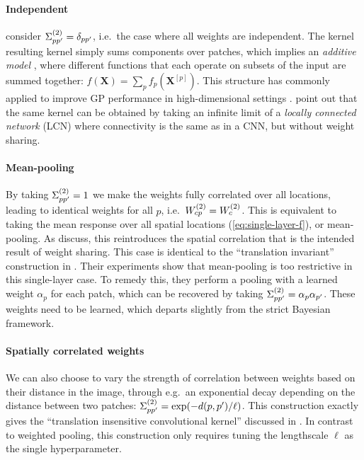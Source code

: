 \documentclass{article}
\theoremstyle{definition}
\newcommand{\vX}{\mathbf{X}}
\begin{document}
\paragraph{Independent} \citet{garriga2018infiniteconv,novak2019infiniteconv} consider $\Sigma^{(2)}_{pp'} = \delta_{pp'}$, i.e.~the case where all weights are independent. The kernel resulting kernel simply sums components over patches, which implies an \emph{additive model} \citep{stone1985}, where different functions that each operate on subsets of the input are summed together: $f(\vX) = \sum_p f_p(\vX^{[p]})$. This structure has commonly applied to improve GP performance in high-dimensional settings \citep[e.g.][]{duvenaud2011additive,durrande2012additive}. \citet{novak2019infiniteconv} point out that the same kernel can be obtained by taking an infinite limit of a \emph{locally connected network} (LCN) \citep{lecun1989generalization} where connectivity is the same as in a CNN, but without weight sharing.

\paragraph{Mean-pooling} By taking $\Sigma^{(2)}_{pp'} = 1$ we make the weights fully correlated over all locations, leading to identical weights for all $p$, i.e.~$W^{(2)}_{cp} = W^{(2)}_{c}$. This is equivalent to taking the mean response over all spatial locations (\cref{eq:single-layer-f}), or mean-pooling. As \citet{novak2019infiniteconv} discuss, this reintroduces the spatial correlation that is the intended result of weight sharing. This case is identical to the ``translation invariant'' construction in . Their experiments show that mean-pooling is too restrictive in this single-layer case. To remedy this, they perform a pooling with a learned weight ${\alpha_p}$ for each patch, which can be recovered by taking $\Sigma^{(2)}_{pp'} = \alpha_p \alpha_{p'}$. These weights need to be learned, which departs slightly from the strict Bayesian framework.

\paragraph{Spatially correlated weights} We can also choose to vary the strength of correlation between weights based on their distance in the image, through e.g.~an exponential decay depending on the distance between two patches: $\Sigma^{(2)}_{pp'} = \exp(-d(p, p')/\ell)$. This construction exactly gives the ``translation insensitive convolutional kernel'' discussed in \citet{dutordoir2020}. In contrast to weighted pooling, this construction only requires tuning the lengthscale $\ell$ as the single hyperparameter.
\end{document}
